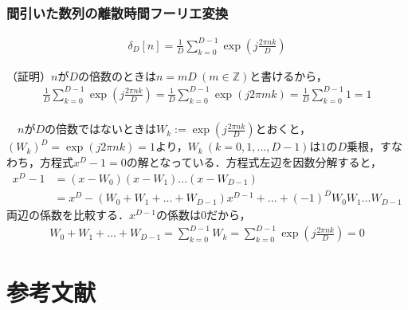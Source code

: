 \documentclass[dvipdfmx,graphicx,14pt]{beamer}
\begin{document}
\begin{frame}[c]
    \frametitle{間引いた数列の離散時間フーリエ変換}
    \scriptsize
    \begin{block}{}
    \vspace*{-17pt}
    \begin{align}
        \delta_{D}[n] = \frac{1}{D} \sum_{k = 0}^{D - 1} \exp\left( j \frac{2\pi nk}{D} \right) \label{eq:decimated_impulse_seq}
    \end{align}
    \end{block}
    （証明）$n$が$D$の倍数のときは$n = mD\ (m \in \mathbb{Z})$と書けるから，
    \begin{align*}
        \frac{1}{D} \sum_{k = 0}^{D - 1} \exp\left( j \frac{2\pi nk}{D} \right) = \frac{1}{D} \sum_{k = 0}^{D - 1} \exp( j 2\pi mk ) = \frac{1}{D} \sum_{k = 0}^{D - 1} 1 = 1
    \end{align*}
    \\~\
    $n$が$D$の倍数ではないときは$\displaystyle W_{k} := \exp\left(j\frac{2\pi nk}{D}\right)$とおくと，$(W_{k})^{D} = \exp(j2\pi nk) = 1$より，$W_{k}\ (k = 0,1, ..., D-1)$は$1$の$D$乗根，すなわち，方程式$x^{D} - 1 = 0$の解となっている．方程式左辺を因数分解すると，
    \begin{align*}
        x^{D} - 1 &= (x - W_{0})(x - W_{1})...(x - W_{D-1}) \\
        &= x^{D} - (W_{0} + W_{1} + ... + W_{D-1}) x^{D-1} + ... + (-1)^{D}W_{0}W_{1}...W_{D-1}
    \end{align*} 
    両辺の係数を比較する．$x^{D-1}$の係数は$0$だから，
    \begin{align*}
        W_{0} + W_{1} + ... + W_{D-1} = \sum_{k = 0}^{D-1} W_{k} = \sum_{k = 0}^{D-1} \exp\left(j\frac{2\pi nk}{D}\right) = 0
    \end{align*} 
\end{frame}

\section{参考文献}
\end{document}
